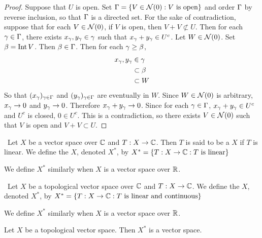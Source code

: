 \documentclass{book}
\begin{document}
	\begin{proof}
		Suppose that $U$ is open. Set $\Gamma = \{V \in \mathcal{N}(0): V \text{ is open}\}$ and order $\Gamma$ by reverse inclusion, so that $\Gamma$ is a directed set. For the sake of contradiction, suppose that for each $V \in \mathcal{N}(0)$, if $V$ is open, then $V + V \not \subset U$. Then for each $\gamma \in \Gamma$, there exists $x_{\gamma}, y_{\gamma} \in \gamma$ such that $x_{\gamma}+y_{\gamma} \in U^c$. Let $W \in \mathcal{N}(0)$. Set $\beta = \operatorname{Int} V$. Then $\beta \in \Gamma$. Then for each $\gamma \geq \beta$, 
		\begin{align*}
			x_{\gamma},y_{\gamma} 
			& \in \gamma \\
			& \subset \beta \\
			& \subset W
		\end{align*}
		So that $(x_{\gamma})_{\gamma \in \Gamma}$ and $(y_{\gamma})_{\gamma \in \Gamma}$ are eventually in $W$. Since $W \in \mathcal{N}(0)$ is arbitrary, $x_{\gamma} \rightarrow 0$ and	$y_{\gamma} \rightarrow 0$. Therefore $x_{\gamma} + y_{\gamma} \rightarrow 0$. Since for each $\gamma \in \Gamma$, $x_{\gamma} + y_{\gamma} \in U^c$ and $U^c$ is closed, $0 \in U^c$. This is a contradiction, so there exists $V \in \mathcal{N}(0)$ such that $V$ is open and $V+V \subset U$.
		\end{proof}
	

	\begin{defn} \
		Let $X$ be a vector space over $\mathbb{C}$ and $T :X \rightarrow \mathbb{C}$. Then $T$ is said to be a  $X$ if $T$ is linear. We define the  $X$, denoted $X^*$, by $ X^* = \{ T:X \rightarrow \mathbb{C}: T \text{ is linear} \} $
	\end{defn}
	
	\begin{note}
		We define $X^*$ similarly when $X$ is a vector space  over $\mathbb{R}$.
	\end{note}
	
	\begin{defn} \
		Let $X$ be a topological vector space over $\mathbb{C}$ and $T :X \rightarrow \mathbb{C}$. We define the  $X$, denoted $X^*$, by $ X^* = \{ T:X \rightarrow \mathbb{C}: T \text{ is linear and continuous} \} $
	\end{defn}
	
	\begin{note}
		We define $X^*$ similarly when $X$ is a vector space  over $\mathbb{R}$.
	\end{note}

	\begin{ex}
		Let $X$ be a topological vector space. Then $X^*$ is a vector space. 
	\end{ex}
\end{document}
